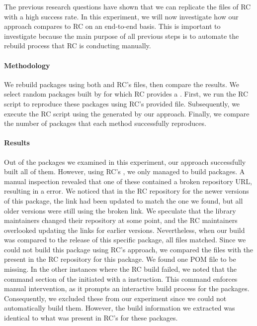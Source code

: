 \documentclass[smallextended]{svjour3}
\newcommand{\maven}[1]{\tool{Maven{#1}}}
\newcommand{\central}{\tool{Maven Central}}
\begin{document}
The previous research questions have shown that we can replicate the  files of RC with a high success rate.
In this experiment, we will now investigate how our approach compares to RC on an end-to-end basis.
This is important to investigate because the main purpose of all previous steps is to automate the rebuild process that RC is conducting manually.

\paragraph{Methodology}
We rebuild packages using both  and RC's  files, then compare the results.
We select  random packages built by \maven{} for which RC provides a . First, we run the RC script to reproduce these packages using RC's provided  file. Subsequently, we execute the RC script using the  generated by our approach. Finally, we compare the number of packages that each method successfully reproduces.

\paragraph{Results}
Out of the  packages we examined in this experiment, our approach successfully built all of them. However, using RC's , we only managed to build  packages. A manual inspection revealed that one of these  contained a broken repository URL, resulting in a  error. We noticed that in the RC repository for the newer versions of this package, the link had been updated to match the one we found, but all older versions were still using the broken link. We speculate that the library maintainers changed their repository at some point, and the RC maintainers overlooked updating the links for earlier versions. Nevertheless, when our build was compared to the \central{} release of this specific package, all files matched. Since we could not build this package using RC's approach, we compared the \maven{} files with the  present in the RC repository for this package. We found one POM file to be missing. In the other  instances where the RC build failed, we noted that the command section of the  initiated with a  instruction. This command enforces manual intervention, as it prompts an interactive build process for the packages. Consequently, we excluded these from our experiment since we could not automatically build them. However, the build information we extracted was identical to what was present in RC's  for these packages.
\end{document}
